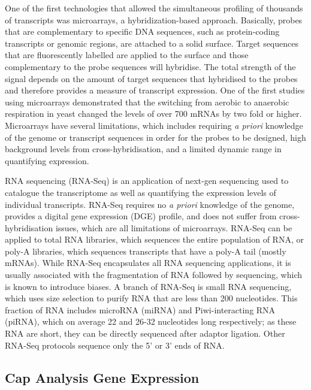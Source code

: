 One of the first technologies that allowed the simultaneous profiling of thousands of transcripts was microarrays\cite{pmid7569999}, a hybridization-based approach. Basically, probes that are complementary to specific DNA sequences, such as protein-coding transcripts or genomic regions, are attached to a solid surface. Target sequences that are fluorescently labelled are applied to the surface and those complementary to the probe sequences will hybridise. The total strength of the signal depends on the amount of target sequences that hybridised to the probes and therefore provides a measure of transcript expression. One of the first studies using microarrays demonstrated that the switching from aerobic to anaerobic respiration in yeast changed the levels of over 700 mRNAs by two fold or higher\cite{pmid9381177}. Microarrays have several limitations, which includes requiring \textit{a priori} knowledge of the genome or transcript sequences in order for the probes to be designed, high background levels from cross-hybridisation\cite{pmid16749918}, and a limited dynamic range in quantifying expression.

RNA sequencing (RNA-Seq) is an application of next-gen sequencing used to catalogue the transcriptome as well as quantifying the expression levels of individual transcripts\cite{pmid19015660}. RNA-Seq requires no \textit{a priori} knowledge of the genome, provides a digital gene expression (DGE) profile, and does not suffer from cross-hybridisation issues, which are all limitations of microarrays. RNA-Seq can be applied to total RNA libraries, which sequences the entire population of RNA, or poly-A libraries, which sequences transcripts that have a poly-A tail (mostly mRNAs). While RNA-Seq encapsulates all RNA sequencing applications, it is usually associated with the fragmentation of RNA followed by sequencing, which is known to introduce biases\cite{pmid18516045}. A branch of RNA-Seq is small RNA sequencing, which uses size selection to purify RNA that are less than 200 nucleotides. This fraction of RNA includes microRNA (miRNA) and Piwi-interacting RNA (piRNA), which on average 22 and 26-32 nucleotides long respectively; as these RNA are short, they can be directly sequenced after adaptor ligation. Other RNA-Seq protocols sequence only the 5'\cite{pmid15300261,pmid14663149} or 3'\cite{pmid22454233} ends of RNA.

\subsection{Cap Analysis Gene Expression}


